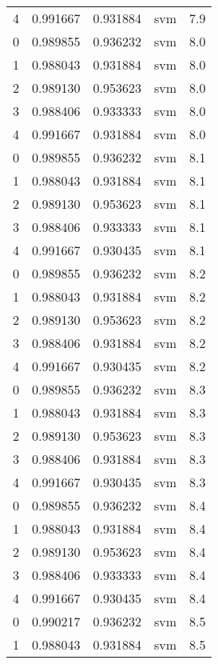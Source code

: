 \begin{tabular}{rrrlr}
     4 & 0.991667 & 0.931884 &      svm &        7.9 \\
     0 & 0.989855 & 0.936232 &      svm &        8.0 \\
     1 & 0.988043 & 0.931884 &      svm &        8.0 \\
     2 & 0.989130 & 0.953623 &      svm &        8.0 \\
     3 & 0.988406 & 0.933333 &      svm &        8.0 \\
     4 & 0.991667 & 0.931884 &      svm &        8.0 \\
     0 & 0.989855 & 0.936232 &      svm &        8.1 \\
     1 & 0.988043 & 0.931884 &      svm &        8.1 \\
     2 & 0.989130 & 0.953623 &      svm &        8.1 \\
     3 & 0.988406 & 0.933333 &      svm &        8.1 \\
     4 & 0.991667 & 0.930435 &      svm &        8.1 \\
     0 & 0.989855 & 0.936232 &      svm &        8.2 \\
     1 & 0.988043 & 0.931884 &      svm &        8.2 \\
     2 & 0.989130 & 0.953623 &      svm &        8.2 \\
     3 & 0.988406 & 0.931884 &      svm &        8.2 \\
     4 & 0.991667 & 0.930435 &      svm &        8.2 \\
     0 & 0.989855 & 0.936232 &      svm &        8.3 \\
     1 & 0.988043 & 0.931884 &      svm &        8.3 \\
     2 & 0.989130 & 0.953623 &      svm &        8.3 \\
     3 & 0.988406 & 0.931884 &      svm &        8.3 \\
     4 & 0.991667 & 0.930435 &      svm &        8.3 \\
     0 & 0.989855 & 0.936232 &      svm &        8.4 \\
     1 & 0.988043 & 0.931884 &      svm &        8.4 \\
     2 & 0.989130 & 0.953623 &      svm &        8.4 \\
     3 & 0.988406 & 0.933333 &      svm &        8.4 \\
     4 & 0.991667 & 0.930435 &      svm &        8.4 \\
     0 & 0.990217 & 0.936232 &      svm &        8.5 \\
     1 & 0.988043 & 0.931884 &      svm &        8.5 \\

\end{tabular}
